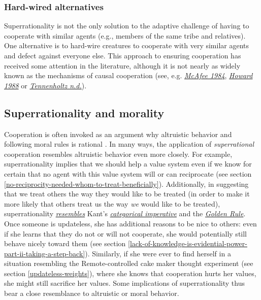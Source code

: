 \subsubsection{Hard-wired alternatives}\label{hard-wired-alternatives}

Superrationality is not the only solution to the adaptive challenge of
having to cooperate with similar agents (e.g., members of the same tribe
and relatives). One alternative is to hard-wire creatures to cooperate
with very similar agents and defect against everyone else. This approach
to ensuring cooperation has received some attention in the literature,
although it is not nearly as widely known as the mechanisms of causal
cooperation (see, e.g.
\href{http://www.mcafee.cc/Papers/PDF/EffectiveComputability.pdf}{\emph{McAfee
1984}},
\href{https://sl4librarian.files.wordpress.com/2016/12/howard1988.pdf}{\emph{Howard
1988}} or
\href{https://ie.technion.ac.il/~moshet/progeqnote4.pdf}{\emph{Tennenholtz
n.d.}}).

\hypertarget{superrationality-and-morality}{\subsection{Superrationality
and morality}\label{superrationality-and-morality}}

Cooperation is often invoked as an argument why altruistic behavior and
following moral rules is rational
\parencite{Dawkins1976-cd,Greene2013-sq}. In many ways, the
application of \emph{superrational} cooperation resembles altruistic
behavior even more closely. For example, superrationality implies that
we should help a value system even if we know for certain that no agent
with this value system will or can reciprocate (see section
\ref{no-reciprocity-needed-whom-to-treat-beneficially}). Additionally, in
suggesting that we treat others the way they would like to be treated
(in order to make it more likely that others treat us the way \emph{we}
would like to be treated), superrationality
\href{http://briantomasik.com/interpreting-the-categorical-imperative/\#Categorical_imperative_as_decision_theory}{\emph{resembles}}
Kant's
\href{https://en.wikipedia.org/wiki/Categorical_imperative}{\emph{categorical
imperative}} and the
\href{https://en.wikipedia.org/wiki/Golden_Rule}{\emph{Golden Rule}}.
Once someone is updateless, she has additional reasons to be nice to
others: even if she learns that they do not or will not cooperate, she
would potentially still behave nicely toward them (see section
\ref{lack-of-knowledge-is-evidential-power-part-ii-taking-a-step-back}).
Similarly, if she were ever to find herself in a situation resembling
the Remote-controlled cake maker thought experiment (see section
\ref{updateless-weights}),
where she knows that cooperation hurts her values, she might still
sacrifice her values. Some implications of superrationality thus bear a
close resemblance to altruistic or moral behavior.

